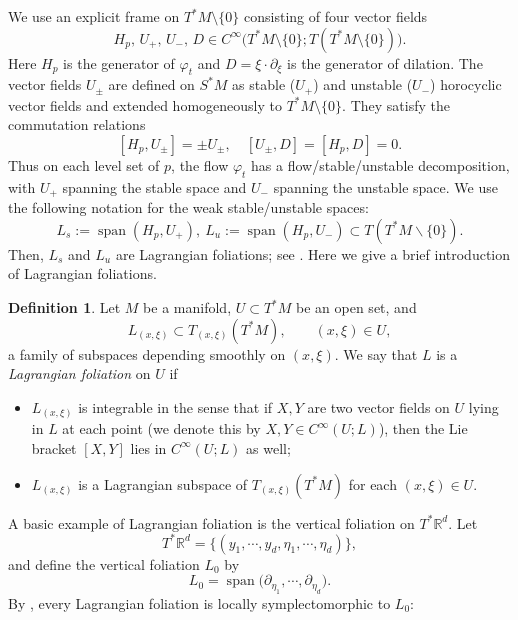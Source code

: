 \documentclass[11pt,oneside,reqno]{amsart}
\newcommand\R{\ensuremath{\mathbb{R}}}
\theoremstyle{definition}
\newtheorem{definition}{Definition}[section]
\numberwithin{equation}{section}
\theoremstyle{plain}
\begin{document}
We use an explicit frame on $T^* M \setminus \{0\}$ consisting of four vector fields
\begin{equation}
   H_p, \,U_{+}, \, U_{-},\, D \in C^{\infty}\big( T^* M \setminus \{0\} ; T( T^* M \setminus \{0\} )\big) . 
\end{equation}
Here $H_p$ is the generator of $\varphi_t$ and $D=\xi \cdot \partial_{\xi}$ is the generator of dilation. The vector fields $U_{\pm}$ are defined on $S^*M$ as stable ($U_{+}$) and unstable ($U_{-}$) horocyclic vector fields and extended homogeneously to $T^*M\setminus \{0\}$. They satisfy the commutation relations
\begin{equation}\label{commutator}
\left[H_p, U_{ \pm}\right]= \pm U_{ \pm}, \quad \left[U_{ \pm}, D\right]=\left[H_p, D\right]=0.
\end{equation}
Thus on each level set of $p$, the flow $\varphi_t$ has a flow/stable/unstable decomposition, with $U_{+}$ spanning the stable space and $U_{-}$ spanning the unstable space. We use the following notation for the weak stable/unstable spaces:
\begin{equation}\label{stablefoliation}
L_s:=\operatorname{span}\left(H_p, U_{+}\right), \ L_u:=\operatorname{span}\left(H_p, U_{-}\right) \subset T (T^* M \backslash \{0\} ).
\end{equation}
Then, $L_s$ and $ L_u$ are Lagrangian foliations; see \cite[Definition 3.1]{dyatlovzahl2016spectral}. Here we give a brief introduction of Lagrangian foliations.
\begin{definition}
Let $M$ be a manifold, $U \subset T^* M$ be an open set, and
\begin{equation*}
    L_{(x, \xi)} \subset T_{(x, \xi)} (T^* M  ), \qquad  (x, \xi) \in U,
\end{equation*}
a family of subspaces depending smoothly on $(x, \xi)$. We say that $L$ is a \emph{Lagrangian foliation} on $U$ if
\begin{itemize}
\item $L_{(x, \xi)}$ is integrable in the sense that if $X, Y$ are two vector fields on $U$ lying in $L$ at each point (we denote this by $X, Y \in C^{\infty}(U ; L)$), then the Lie bracket $[X, Y]$ lies in $C^{\infty}(U ; L)$ as well;
\item $L_{(x, \xi)}$ is a Lagrangian subspace of $T_{(x, \xi)}\left(T^* M\right)$ for each $(x, \xi) \in U$.
\end{itemize}
\end{definition} 

A basic example of Lagrangian foliation is the vertical foliation on $T^*\R^d$. Let 
\begin{equation*}
    T^*\mathbb{R}^d=\{(y_{1},\cdots,y_{d},\eta_{1},\cdots,\eta_{d})\},
\end{equation*}
and define the vertical foliation $L_0$ by
\begin{equation*}
    L_0=\operatorname{span} \big(\partial_{\eta_1}, \cdots, \partial_{\eta_d} \big).
\end{equation*}
By \cite[Lemma 3.6]{dyatlovzahl2016spectral}, every Lagrangian foliation is locally symplectomorphic to $L_0$:
\end{document}
